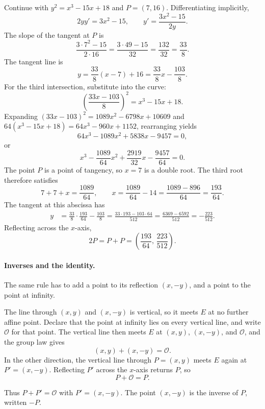 \begin{example}[Doubling]
Continue with $y^2=x^3-15x+18$ and $P=(7,16)$. Differentiating implicitly,
\[
    2yy'=3x^2-15,
    \qquad
    y'=\frac{3x^2-15}{2y}.
\]
The slope of the tangent at $P$ is
\[
    \frac{3\cdot 7^2-15}{2\cdot 16}
    =\frac{3\cdot 49-15}{32}
    =\frac{132}{32}
    =\frac{33}{8}.
\]
The tangent line is
\[
    y=\frac{33}{8}(x-7)+16
    =\frac{33}{8}x-\frac{103}{8}.
\]
For the third intersection, substitute into the curve:
\[
    \left(\frac{33x-103}{8}\right)^2=x^3-15x+18.
\]
Expanding $(33x-103)^2=1089x^2-6798x+10609$ and $64(x^3-15x+18)=64x^3-960x+1152$, rearranging yields
\[
    64x^3-1089x^2+5838x-9457=0,
\]
or
\[
    x^3-\frac{1089}{64}x^2+\frac{2919}{32}x-\frac{9457}{64}=0.
\]
The point $P$ is a point of tangency, so $x=7$ is a double root. The third root therefore satisfies
\[
    7+7+x=\frac{1089}{64},
    \qquad
    x=\frac{1089}{64}-14
     =\frac{1089-896}{64}
     =\frac{193}{64}.
\]
The tangent at this abscissa has
\begin{align*}
    y
    &=\frac{33}{8}\cdot\frac{193}{64}-\frac{103}{8}
     =\frac{33\cdot 193-103\cdot 64}{512}
     =\frac{6369-6592}{512}
     =-\frac{223}{512}.
\end{align*}
Reflecting across the $x$-axis,
\[
    2P=P+P=\left(\frac{193}{64},\,\frac{223}{512}\right).
\]
\end{example}

\paragraph{Inverses and the identity.}
The same rule has to add a point to its reflection $(x,-y)$, and a point to the point at infinity.

The line through $(x,y)$ and $(x,-y)$ is vertical, so it meets $E$ at no further affine point. Declare that the point at infinity lies on every vertical line, and write $\mathcal{O}$ for that point. The vertical line then meets $E$ at $(x,y)$, $(x,-y)$, and $\mathcal{O}$, and the group law gives
\[
    (x,y)+(x,-y)=\mathcal{O}.
\]
In the other direction, the vertical line through $P=(x,y)$ meets $E$ again at $P'=(x,-y)$. Reflecting $P'$ across the $x$-axis returns $P$, so
\[
    P+\mathcal{O}=P.
\]


Thus $P+P'=\mathcal{O}$ with $P'=(x,-y)$. The point $(x,-y)$ is the inverse of $P$, written $-P$.

